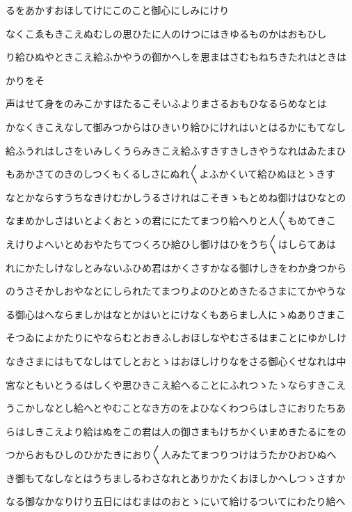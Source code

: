 \documentclass[a4paper,11pt,landscape]{ltjtarticle}
\begin{document}
るをあかすおほしてけにこのこと御心にしみにけり
\par\medskip
なくこゑもきこえぬむしの思ひたに人のけつにはきゆるものかはおもひし
\par\medskip
り給ひぬやときこえ給ふかやうの御かへしを思まはさむもねちきたれはときは
\par\medskip
かりをそ
\par\medskip
声はせて身をのみこかすほたるこそいふよりまさるおもひなるらめなとは
\par\medskip
かなくきこえなして御みつからはひきいり給ひにけれはいとはるかにもてなし
\par\medskip
給ふうれはしさをいみしくうらみきこえ給ふすきすきしきやうなれはゐたまひ
\par\medskip
もあかさてのきのしつくもくるしさにぬれ〱よふかくいて給ひぬほとゝきす
\par\medskip
なとかならすうちなきけむかしうるさけれはこそきゝもとめね御けはひなとの
\par\medskip
なまめかしさはいとよくおとゝの君ににたてまつり給へりと人〱もめてきこ
\par\medskip
えけりよへいとめおやたちてつくろひ給ひし御けはひをうち〱はしらてあは
\par\medskip
れにかたしけなしとみないふひめ君はかくさすかなる御けしきをわか身つから
\par\medskip
のうさそかしおやなとにしられたてまつりよのひとめきたるさまにてかやうな
\par\medskip
る御心はへならましかはなとかはいとにけなくもあらまし人にゝぬありさまこ
\par\medskip
そつゐによかたりにやならむとおきふしおほしなやむさるはまことにゆかしけ
\par\medskip
なきさまにはもてなしはてしとおとゝはおほしけりなをさる御心くせなれは中
\par\medskip
宮なともいとうるはしくや思ひきこえ給へることにふれつゝたゝならすきこえ
\par\medskip
うこかしなとし給へとやむことなき方のをよひなくわつらはしさにおりたちあ
\par\medskip
らはしきこえより給はぬをこの君は人の御さまもけちかくいまめきたるにをの
\par\medskip
つからおもひしのひかたきにおり〱人みたてまつりつけはうたかひおひぬへ
\par\medskip
き御もてなしなとはうちましるわさなれとありかたくおほしかへしつゝさすか
\par\medskip
なる御なかなりけり五日にはむまはのおとゝにいて給けるついてにわたり給へ
\par\medskip
\end{document}
